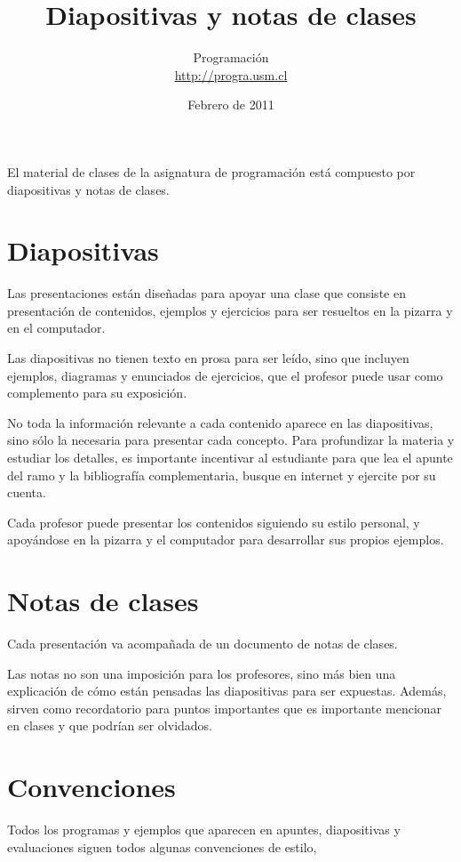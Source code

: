 \documentclass[12pt,spanish]{article}
\title{Diapositivas y notas de clases}
\author{Programación \\ \url{http://progra.usm.cl}}
\date{Febrero de 2011}
\begin{document}
  \maketitle

  El material de clases de la asignatura de programación
  está compuesto por diapositivas y notas de clases.

  \section*{Diapositivas}

  Las presentaciones están diseñadas para apoyar una clase
  que consiste en presentación de contenidos,
  ejemplos y ejercicios para ser resueltos
  en la pizarra y en el computador.

  Las diapositivas no tienen texto en prosa para ser leído,
  sino que incluyen ejemplos, diagramas y enunciados de ejercicios,
  que el profesor puede usar como complemento para su exposición.

  No toda la información relevante a cada contenido
  aparece en las diapositivas,
  sino sólo la necesaria para presentar cada concepto.
  Para profundizar la materia y estudiar los detalles,
  es importante incentivar al estudiante
  para que lea el apunte del ramo y la bibliografía complementaria,
  busque en internet y ejercite por su cuenta.

  Cada profesor puede presentar los contenidos
  siguiendo su estilo personal,
  y apoyándose en la pizarra y el computador
  para desarrollar sus propios ejemplos.

  \section*{Notas de clases}
  Cada presentación va acompañada de un documento de notas de clases.

  Las notas no son una imposición para los profesores,
  sino más bien una explicación
  de cómo están pensadas las diapositivas para ser expuestas.
  Además, sirven como recordatorio para puntos importantes
  que es importante mencionar en clases
  y que podrían ser olvidados.

  \section*{Convenciones}

  Todos los programas y ejemplos que aparecen
  en apuntes, diapositivas y evaluaciones
  siguen todos algunas convenciones de estilo,
\end{document}
